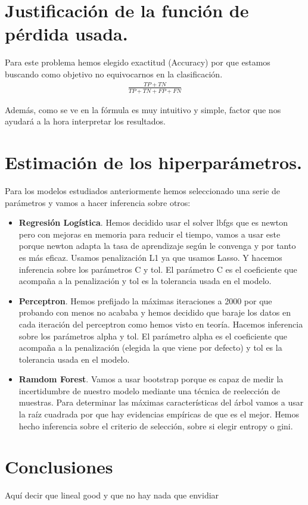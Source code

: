 \documentclass[a4paper,11pt]{article}
\begin{document}
\section{Justificación de la función de pérdida usada.}


Para este problema hemos elegido exactitud (Accuracy) por que estamos buscando
como objetivo no equivocarnos en la clasificación. 
\begin{align*}
\frac{TP+TN}{TP+TN+FP+FN}
\end{align*}

Además, como se ve en la fórmula es muy intuitivo y simple, factor que nos
ayudará a la hora interpretar los resultados.

\section{Estimación de los hiperparámetros.}


Para los modelos estudiados anteriormente hemos seleccionado una serie de
parámetros y vamos a hacer inferencia sobre otros:

\begin{itemize}

\item \textbf{Regresión Logística}. Hemos decidido usar el solver lbfgs que es
newton pero con mejoras en memoria para reducir el tiempo, vamos a usar este
porque newton adapta la tasa de aprendizaje según le convenga y por tanto es más
eficaz. Usamos penalización L1 ya que usamos Lasso. Y hacemos inferencia sobre
los parámetros C y tol. El parámetro C es el coeficiente que acompaña a la
penalización y tol es la tolerancia usada en el modelo.

\item \textbf{Perceptron}. Hemos prefijado la máximas iteraciones a 2000 por que
probando con menos no acababa y hemos decidido que baraje los datos en cada
iteración del perceptron como hemos visto en teoría. Hacemos inferencia sobre
los parámetros alpha y tol. El parámetro alpha es el coeficiente que acompaña a
la penalización (elegida la que viene por defecto) y tol es la tolerancia usada
en el modelo.

\item \textbf{Ramdom Forest}. Vamos a usar bootstrap porque es capaz de medir la
incertidumbre de nuestro modelo mediante una técnica de reelección de muestras.
Para determinar las máximas características del árbol vamos a usar la raíz
cuadrada por que hay evidencias empíricas de que es el mejor. Hemos hecho
inferencia sobre el criterio de selección, sobre si elegir entropy o gini. 

\end{itemize}

\section{Conclusiones}

Aquí decir que lineal good y que no hay nada que envidiar

\end{document}
